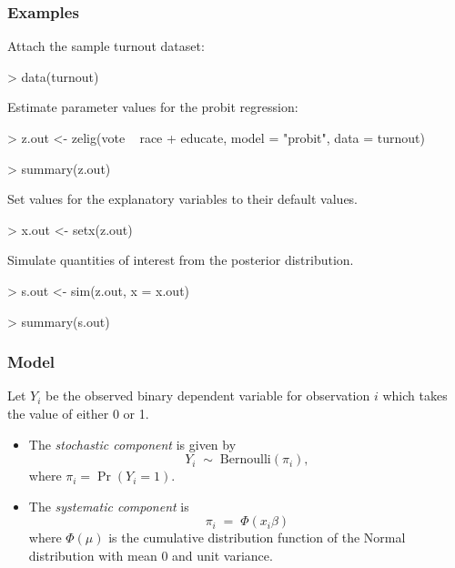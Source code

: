 \documentclass{article}
\begin{document}
\subsubsection{Examples}
Attach the sample turnout dataset:
\begin{Schunk}
\begin{Sinput}
> data(turnout)
\end{Sinput}
\end{Schunk}
Estimate parameter values for the probit regression:
\begin{Schunk}
\begin{Sinput}
> z.out <- zelig(vote ~ race + educate, model = "probit", data = turnout)
\end{Sinput}
\end{Schunk}
\begin{Schunk}
\begin{Sinput}
> summary(z.out)
\end{Sinput}
\end{Schunk}
Set values for the explanatory variables to their default values.
\begin{Schunk}
\begin{Sinput}
> x.out <- setx(z.out)
\end{Sinput}
\end{Schunk}
Simulate quantities of interest from the posterior distribution.
\begin{Schunk}
\begin{Sinput}
> s.out <- sim(z.out, x = x.out)
\end{Sinput}
\end{Schunk}
\begin{Schunk}
\begin{Sinput}
> summary(s.out)
\end{Sinput}
\end{Schunk}

\subsubsection{Model}
Let $Y_i$ be the observed binary dependent variable for observation
$i$ which takes the value of either 0 or 1.
\begin{itemize}
\item The \emph{stochastic component} is given by  
\begin{equation*}
Y_i \; \sim \; \textrm{Bernoulli}(\pi_i), 
\end{equation*}
where $\pi_i=\Pr(Y_i=1)$.

\item The \emph{systematic component} is 
\begin{equation*}
  \pi_i \; = \; \Phi (x_i \beta)
\end{equation*}
where $\Phi(\mu)$ is the cumulative distribution function of the
Normal distribution with mean 0 and unit variance.
\end{itemize}
\end{document}

